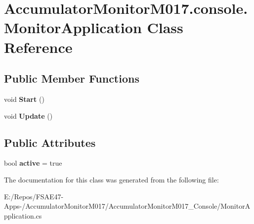 \hypertarget{class_accumulator_monitor_m017_1_1console_1_1_monitor_application}{}\section{Accumulator\+Monitor\+M017.\+console.\+Monitor\+Application Class Reference}
\label{class_accumulator_monitor_m017_1_1console_1_1_monitor_application}
\subsection*{Public Member Functions}
\begin{DoxyCompactItemize}
\item 
\mbox{\label{class_accumulator_monitor_m017_1_1console_1_1_monitor_application_a1835dcf99c106364d8eb425d432b34ac}} 
void {\bfseries Start} ()
\item 
\mbox{\label{class_accumulator_monitor_m017_1_1console_1_1_monitor_application_adf7c817a53687b9cb5344640d24e190e}} 
void {\bfseries Update} ()
\end{DoxyCompactItemize}
\subsection*{Public Attributes}
\begin{DoxyCompactItemize}
\item 
\mbox{\label{class_accumulator_monitor_m017_1_1console_1_1_monitor_application_a7645f7b19bc5168e1bf71e2dd4d4bb0f}} 
bool {\bfseries active} = true
\end{DoxyCompactItemize}


The documentation for this class was generated from the following file\+:\begin{DoxyCompactItemize}
\item 
E\+:/\+Repos/\+F\+S\+A\+E47-\/\+Apps-\//\+Accumulator\+Monitor\+M017/\+Accumulator\+Monitor\+M017\+\_\+\+Console/Monitor\+Application.\+cs\end{DoxyCompactItemize}
